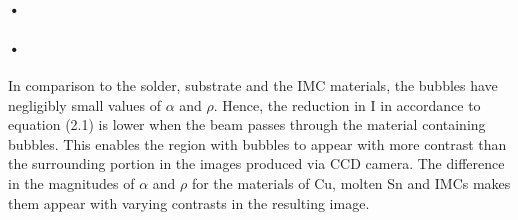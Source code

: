 \paragraph*{•}
\paragraph*{•}
In comparison to the solder, substrate and the IMC materials, the bubbles have negligibly small values of $\alpha$ and $\rho$. Hence, the reduction in I in accordance to equation (2.1) is lower when the beam passes through the material containing bubbles. This enables the region with bubbles to appear with more contrast than the surrounding portion in the images produced via CCD camera. The difference in the magnitudes of  $\alpha$ and $\rho$ for the materials of Cu, molten Sn and IMCs makes them appear with varying contrasts in the resulting image.

